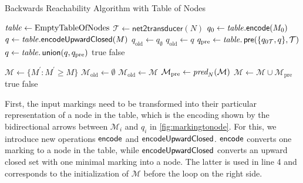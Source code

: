 \begin{algorithm}[htb]
\caption{Backwards Reachability Algorithm with Table of Nodes}\label{alg:bw_wwa}
\begin{minipage}[t]{0.6\textwidth}
\begin{algorithmic}[1]
\State $\mathit{table} \gets \text{EmptyTableOfNodes}$
\State $\mathcal{T} \gets \textsf{net2transducer}(N)$
\State $q_{0} \gets  \mathit{table}.\textsf{encode}(M_{0})$
\State $q \gets \mathit{table}.\textsf{encodeUpwardClosed}(M)$
\State $q_{\text{old}} \gets q_{\emptyset}$
	\State $q_{\text{old}}  \gets q$
	\State $q_{\text{pre}} \gets \mathit{table}.\operatorname{\textsf{pre}}(\{q_{0\mathcal{T}},q\},\mathcal{T})$
	\State $q \gets \mathit{table}.\operatorname{\textsf{union}}(q, q_{\text{pre}})$
	\Return true
\EndIf
{}
    \Return false
\EndIf
\EndWhile
\end{algorithmic}
\end{minipage}
\begin{algocolor}
\begin{minipage}[t]{0.37\textwidth}
\begin{algorithmic}
\State 
\State 
\State 
\State $\mathcal{M} \gets \{ M^{'} : M^{'} \ge M \}$
\State $\mathcal{M}_{\text{old}} \gets \emptyset$
	\State $\mathcal{M}_{\text{old}} \gets \mathcal{M}$
	\State $\mathcal{M}_{\text{pre}} \gets \operatorname{\textit{pred}}_{N}(\mathcal{M})$
	\State $\mathcal{M} \gets \mathcal{M}  \cup \mathcal{M}_{\text{pre}}$
	\Return true
\EndIf
{}
    \Return false
\EndIf
\EndWhile
\end{algorithmic}
\end{minipage}
\end{algocolor}
\end{algorithm}

First, the input markings need to be transformed into their particular representation of a node in the table, which is the encoding shown by the bidirectional arrows between $\mathcal{M}_{i}$ and $q_{i}$ in \autoref{fig:markingtonode}. 
For this, we introduce new operations $\operatorname{\textsf{encode}}$ and $\operatorname{\textsf{encodeUpwardClosed}}$. $\operatorname{\textsf{encode}}$ converts one marking to a node in the table, while $\operatorname{\textsf{encodeUpwardClosed}}$ converts an upward closed set with one minimal marking into a node. The latter is used in line 4 and corresponds to the initialization of $\mathcal{M}$ before the loop on the right side.

\par


